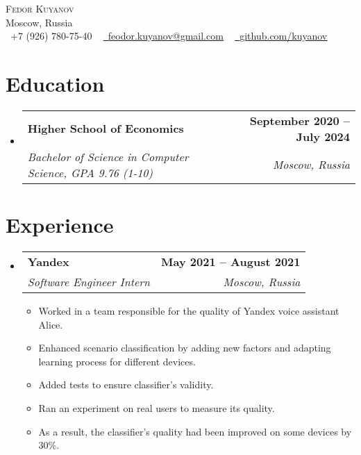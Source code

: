 \documentclass[letterpaper,11pt]{article}
\makeatletter
\newcommand{\resumeItem}[1]{
    \item\small{
        {#1 \vspace{-2pt}}
    }
}
\newcommand{\resumeSubheading}[4]{
    \vspace{-2pt}\item
    \begin{tabular*}{1.0\textwidth}[t]{l@{\extracolsep{\fill}}r}
        \textbf{#1} & \textbf{\small #2} \\
        \textit{\small#3} & \textit{\small #4} \\
    \end{tabular*}\vspace{-7pt}
}
\newcommand{\resumeSubHeadingListStart}{\begin{itemize}[leftmargin=0.0in, label={}]}
\newcommand{\resumeSubHeadingListEnd}{\end{itemize}}
\newcommand{\resumeItemListStart}{\begin{itemize}}
\newcommand{\resumeItemListEnd}{\end{itemize}\vspace{-5pt}}
\makeatother
\begin{document}
\begin{center}
    {\Huge \scshape Fedor Kuyanov} \\ \vspace{3pt}
    Moscow, Russia \\ \vspace{5pt}
    \small \raisebox{-0.1\height}\faPhone\ +7 (926) 780-75-40 ~ \href{mailto:feodor.kuyanov@gmail.com}{\raisebox{-0.2\height}\faEnvelope\  \underline{feodor.kuyanov@gmail.com}} ~ 
    \href{https://github.com/kuyanov}{\raisebox{-0.2\height}\faGithub\ \underline{github.com/kuyanov}}
    \vspace{-8pt}
\end{center}


\section{Education}
    \resumeSubHeadingListStart
    \resumeSubheading
        {Higher School of Economics}{September 2020 -- July 2024}
        {Bachelor of Science in Computer Science, GPA 9.76 (1-10)}{Moscow, Russia}
    \resumeSubHeadingListEnd


\section{Experience}
    \resumeSubHeadingListStart
    \resumeSubheading
        {Yandex}{May 2021 -- August 2021}
        {Software Engineer Intern}{Moscow, Russia}
    \resumeItemListStart
        \resumeItem{Worked in a team responsible for the quality of Yandex voice assistant Alice.}
        \resumeItem{Enhanced scenario classification by adding new factors and adapting learning process for different devices.}
        \resumeItem{Added tests to ensure classifier's validity.}
        \resumeItem{Ran an experiment on real users to measure its quality.}
        \resumeItem{As a result, the classifier's quality had been improved on some devices by 30\%.}
    \resumeItemListEnd
    \resumeSubHeadingListEnd
\vspace{-16pt}


\end{document}
